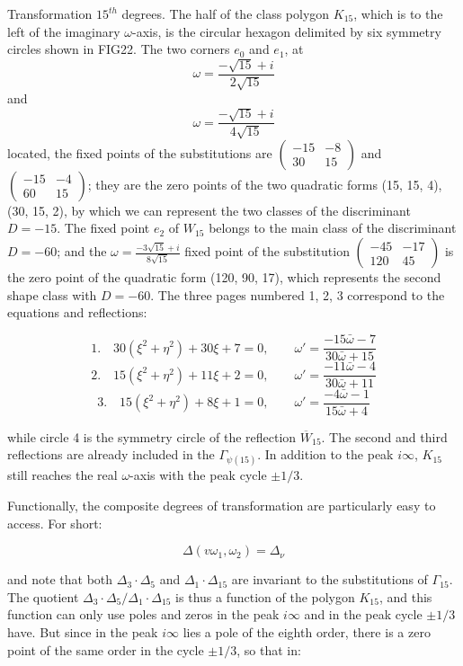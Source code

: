 \documentclass{article}
\begin{document}
Transformation $15^{th}$ degrees. The half of the class polygon $K_{15}$, which is to the left of the imaginary $\omega$-axis, is the circular hexagon delimited by six symmetry circles shown in FIG22. The two corners $e_0$ and $ e_1 $, at
$$\omega=\frac{-\sqrt{15}+i}{2\sqrt{15}}$$
and
$$\omega=\frac{-\sqrt{15}+i}{4\sqrt{15}}$$
located, the fixed points of the substitutions are $\begin{pmatrix}-15&-8\\30&15\end{pmatrix}$ and $\begin{pmatrix}-15&-4\\60&15\end{pmatrix}$; they are the zero points of the two quadratic forms (15, 15, 4), (30, 15, 2), by which we can represent the two classes of the discriminant $D=-15$. The fixed point $e_2$ of $W_{15}$ belongs to the main class of the discriminant $ D=-60$; and the $\omega=\frac{-3\sqrt{15}+i}{8\sqrt{15}}$ fixed point of the substitution $\begin{pmatrix}-45&-17\\120&45\end{pmatrix}$ is the zero point of the quadratic form (120, 90, 17), which represents the second shape class with $D=-60$. The three pages numbered 1, 2, 3 correspond to the equations and reflections:

$$1.\quad 30(\xi^2+\eta^2)+30\xi+7=0,\qquad \omega'=\frac{-15\bar{\omega}-7}{30\bar{\omega}+15}$$
$$2.\quad 15(\xi^2+\eta^2)+11\xi+2=0,\qquad \omega'=\frac{-11\bar{\omega}-4}{30\bar{\omega}+11}$$
$$3.\quad 15(\xi^2+\eta^2)+8\xi+1=0,\qquad \omega'=\frac{-4\bar{\omega}-1}{15\bar{\omega}+4}$$

while circle 4 is the symmetry circle of the reflection $\overline{W}_{15}$. The second and third reflections are already included in the $\Gamma_{\psi(15)}$. In addition to the peak $i\infty $, $K_{15}$ still reaches the real $\omega$-axis with the peak cycle $\pm1/3$. 

Functionally, the composite degrees of transformation are particularly easy to access. For short:

$$\Delta(v\omega_1,\omega_2)=\Delta_{\nu}$$

and note that both $ \Delta_3\cdot\Delta_5$ and $\Delta_1\cdot\Delta_{15}$ are invariant to the substitutions of $\Gamma_{15}$. The quotient $\Delta_3\cdot\Delta_5/\Delta_1\cdot\Delta_{15} $ is thus a function of the polygon $K_{15}$, and this function can only use poles and zeros in the peak $i\infty$ and in the peak cycle $\pm1/3$ have. But since in the peak $i\infty$ lies a pole of the eighth order, there is a zero point of the same order in the cycle $\pm1/3$, so that in:
\end{document}
